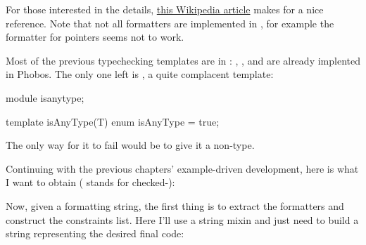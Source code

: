 For those interested in the details, \href{http://en.wikipedia.org/wiki/Printf_format_string}{this Wikipedia article} makes for a nice reference. Note that not all formatters are implemented in , for example the  formatter for \DD{*} pointers seems not to work.

Most of the previous typechecking templates are in : , ,  and  are already implented in Phobos. The only one left is , a quite complacent template:

\begin{dcode}
module isanytype;

template isAnyType(T)
{
    enum isAnyType = true;
}
\end{dcode}

The only way for it to fail would be to give it a non-type.

Continuing with the previous chapters' example-driven development, here is what I want to obtain ( stands for checked-):

\label{usingcheckedwrite}

Now, given a formatting string, the first thing is to extract the formatters and construct the constraints list. Here I'll use a string mixin and just need to build a string representing the desired final code:

